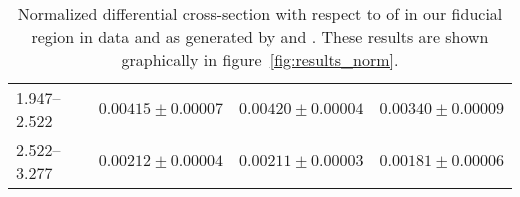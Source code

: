 \begin{table}
\begin{center}
\begin{tabular}{@{}l r r r@{}}
            1.947--2.522  &  $0.00415  \pm  0.00007$  &  $0.00420  \pm  0.00004$  &  $0.00340  \pm  0.00009$  \\
            2.522--3.277  &  $0.00212  \pm  0.00004$  &  $0.00211  \pm  0.00003$  &  $0.00181  \pm  0.00006$  \\
            \bottomrule
        \end{tabular}
    \end{center}
    \caption[
        Normalized differential cross-section with respect to \phistar of
        \Ztoee.
    ]{
        Normalized differential cross-section with respect to \phistar of
        \Ztoee in our fiducial region in data and as generated by \MADGRAPH and
        \POWHEG. These results are shown graphically in
        figure~\ref{fig:results_norm}.
    }
    \label{tab:results_norm}
\end{table}
